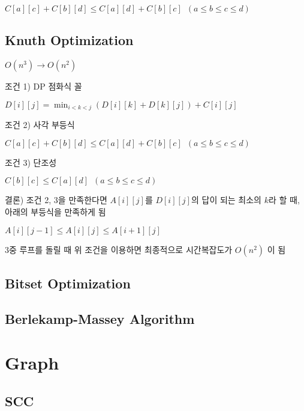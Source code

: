 \documentclass[8pt,landscape,a4paper,twocolumn]{article}
\begin{document}
$C[a][c] + C[b][d] \leq C[a][d] + C[b][c] \phantom{1} (a \leq b \leq c \leq d)$



\subsection{Knuth Optimization}

$O(n^{3}) \to O(n^{2})$

조건 1) DP 점화식 꼴

$D[i][j] = \min_{i<k<j}( D[i][k] + D[k][j] ) + C[i][j]$

조건 2) 사각 부등식

$C[a][c] + C[b][d] \leq C[a][d] + C[b][c] \phantom{1} (a \leq b \leq c \leq d)$

조건 3) 단조성

$C[b][c] \leq C[a][d] \phantom{1} (a \leq b \leq c \leq d)$

결론) 조건 2, 3을 만족한다면  $A[i][j]$를 $D[i][j]$의 답이 되는 최소의 $k$라 할 때, 아래의 부등식을 만족하게 됨

$A[i][j-1] \leq A[i][j] \leq A[i+1][j]$

3중 루프를 돌릴 때 위 조건을 이용하면 최종적으로 시간복잡도가 $O(n^{2})$ 이 됨



\subsection{Bitset Optimization}


\subsection{Berlekamp-Massey Algorithm}


\section{Graph}

\subsection{SCC}

\end{document}
